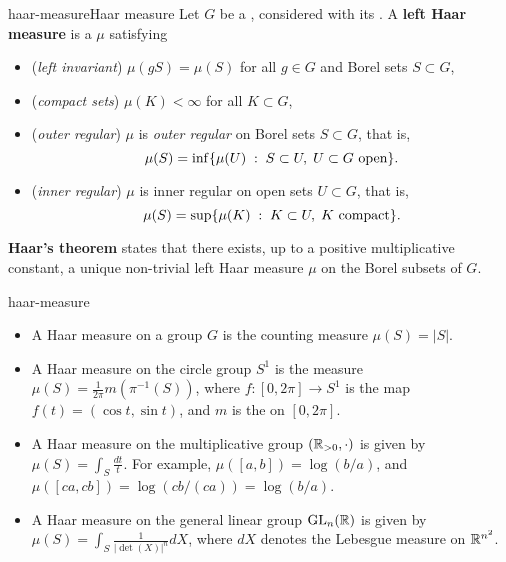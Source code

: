 \begin{topic}{haar-measure}{Haar measure}
    Let $G$ be a   , considered with its . A \textbf{left Haar measure} is a  $\mu$ satisfying
    \begin{itemize}
        \item (\textit{left invariant}) $\mu(gS) = \mu(S)$ for all $g \in G$ and Borel sets $S \subset G$,
        \item (\textit{compact sets}) $\mu(K) < \infty$ for all  $K \subset G$,
        \item (\textit{outer regular}) $\mu$ is \textit{outer regular} on Borel sets $S \subset G$, that is,
        \[ \mu(S) = \inf \{ \mu(U) \;:\; S \subset U, \; U \subset G \textup{ open} \} . \]
        \item (\textit{inner regular}) $\mu$ is inner regular on open sets $U \subset G$, that is,
        \[ \mu(S) = \sup \{ \mu(K) \;:\; K \subset U, \; K \textup{ compact} \} . \]
    \end{itemize}
    \textbf{Haar's theorem} states that there exists, up to a positive multiplicative constant, a unique non-trivial left Haar measure $\mu$ on the Borel subsets of $G$.
\end{topic}

\begin{example}{haar-measure}
    \begin{itemize}
        \item A Haar measure on a  group $G$ is the counting measure $\mu(S) = |S|$.
        \item A Haar measure on the circle group $S^1$ is the measure $\mu(S) = \frac{1}{2 \pi} m(\pi^{-1}(S))$, where $f \colon [0, 2 \pi] \to S^1$ is the map $f(t) = (\cos t, \sin t)$, and $m$ is the  on $[0, 2 \pi]$.
        \item A Haar measure on the multiplicative group $(\mathbb{R}_{> 0}, \cdot)$ is given by $\mu(S) = \int_S \frac{dt}{t}$. For example, $\mu([a, b]) = \log(b/a)$, and $\mu([ca, cb]) = \log(cb/(ca)) = \log(b/a)$.
        \item A Haar measure on the general linear group $\textup{GL}_n(\mathbb{R})$ is given by $\mu(S) = \int_S \frac{1}{|\det(X)|^n} dX$, where $dX$ denotes the Lebesgue measure on $\mathbb{R}^{n^2}$.
    \end{itemize}
\end{example}

